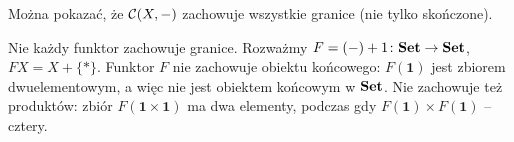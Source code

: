 \begin{uwaga}
Można pokazać, że $\mathcal{C}(X, -)$ zachowuje wszystkie granice (nie tylko skończone).
\end{uwaga}

\begin{przyklad}
Nie każdy funktor zachowuje granice. Rozważmy $F = (-) + 1 \colon \mathbf{Set} \to \mathbf{Set}$, $FX = X + \{\ast\}$. Funktor $F$ nie zachowuje obiektu końcowego: $F(\mathbf{1})$ jest zbiorem dwuelementowym, a więc nie jest obiektem końcowym w $\mathbf{Set}$. Nie zachowuje też produktów: zbiór $F(\mathbf{1}\times\mathbf{1})$ ma dwa elementy, podczas gdy $F(\mathbf{1})\times F(\mathbf{1})$ -- cztery.
\end{przyklad}
